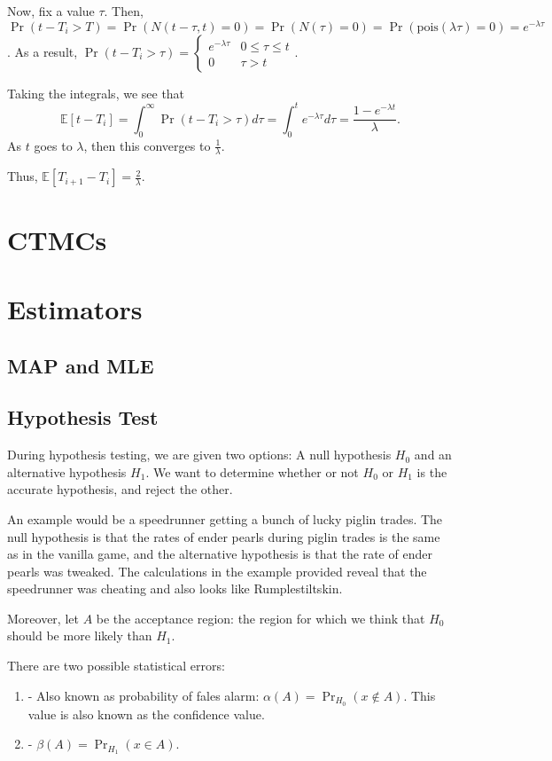 \documentclass{article}
\newcommand{\EE}{\mathbb{E}}
\newcommand{\pois}{\mathrm{pois}}
\begin{document}
Now, fix a value $\tau$. Then, $\Pr(t - T_i > T) = \Pr(N(t-\tau, t) = 0) = \Pr(N(\tau) = 0) = \Pr(\pois(\lambda \tau) = 0) = e^{- \lambda \tau}$.
As a result, $\Pr(t - T_i > \tau) = \begin{cases} e^{-\lambda \tau} & 0 \leq \tau \leq t \\ 0 & \tau > t \end{cases}$.

Taking the integrals, we see that 
\[\EE[t - T_i] = \int_{0}^{\infty} \Pr(t - T_i > \tau) d \tau = \int_{0}^t e^{-\lambda \tau} d\tau = \frac{1 - e^{-\lambda t}}{\lambda}.\] 
As $t$ goes to $\lambda$, then this converges to $\frac{1}{\lambda}$. 

Thus, $\EE[T_{i+1} - T_i] = \boxed{\frac{2}{\lambda}}$.

\section{CTMCs}

\section{Estimators}
\subsection{MAP and MLE}


\subsection{Hypothesis Test}
During hypothesis testing, we are given two options: A null hypothesis $H_0$ and an alternative hypothesis $H_1$. We want to determine whether or not $H_0$ or $H_1$ is the accurate hypothesis, and reject the other.

An example would be a speedrunner getting a bunch of lucky piglin trades. The null hypothesis is that the rates of ender pearls during piglin trades is the same as in the vanilla game, and the alternative hypothesis is that the rate of ender pearls was tweaked. The calculations in the example provided reveal that the speedrunner was cheating and also looks like Rumplestiltskin.

Moreover, let $A$ be the acceptance region: the region for which we think that $H_0$ should be more likely than $H_1$.

There are two possible statistical errors:
\begin{enumerate}
	\item {} - Also known as probability of fales alarm: $\alpha(A) = \Pr_{H_0} (x \not \in A)$.
		This value is also known as the confidence value.
	\item {} - $\beta(A) = \Pr_{H_1} (x \in A)$.
	\end{enumerate}
\end{document}
